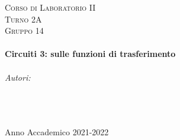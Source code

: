 \documentclass[a4paper]{article}
\begin{document}
\begin{titlepage}
\center
    
\textsc{\LARGE Corso di Laboratorio II}\\[1.5cm] %
\textsc{\large Turno 2A}\\[0.5cm] %
\textsc{\large Gruppo 14}\\[0.5cm]

\HRule \\[0.6cm]
{ \huge \bfseries Circuiti 3: sulle funzioni di trasferimento}\\[0.4cm] %
\HRule \\[1.5cm]
    

\Large \emph{Autori:} \\
\textsc{} \\
\textsc{} \\
\textsc{} \\ [4cm]

\vspace{8cm}

{\large Anno Accademico 2021-2022}\\[2cm] %


\vfill
\end{titlepage}




\tableofcontents
\clearpage

\listoffigures
{}
\clearpage

\setcounter{page}{1}
\end{document}
